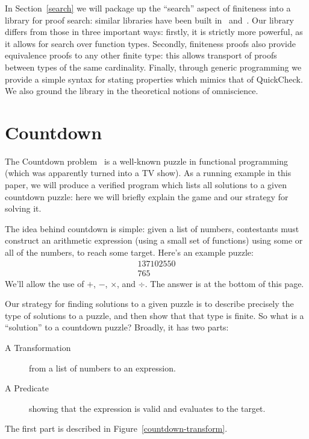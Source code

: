 In Section~\ref{search} we will package up the ``search'' aspect of finiteness
into a library for proof search: similar libraries have been built
in~\cite{fruminFiniteSetsHomotopy2018}
and~\cite{firsovDependentlyTypedProgramming2015}.
Our library differs from those in three important ways: firstly, it is strictly
more powerful, as it allows for search over function types.
Secondly, finiteness proofs also provide equivalence proofs to any other finite
type: this allows transport of proofs between types of the same cardinality.
Finally, through generic programming we provide a simple syntax for stating
properties which mimics that of QuickCheck.
We also ground the library in the theoretical notions of omniscience.
\section{Countdown}
The Countdown problem~\cite{huttonCountdownProblem2002} is a well-known puzzle
in functional programming (which was apparently turned into a TV show).
As a running example in this paper, we will produce a verified program which
lists all solutions to a given countdown puzzle: here we will briefly explain
the game and our strategy for solving it.

The idea behind countdown is simple: given a list of numbers, contestants must
construct an arithmetic expression (using a small set of functions) using some
or all of the numbers, to reach some target.
Here's an example puzzle:
\begin{gather*}
  \boxed{1} \boxed{3} \boxed{7} \boxed{10} \boxed{25} \boxed{50} \\
  \boxed{765} \tag{Target}
\end{gather*}
We'll allow the use of \(+\), \(-\), \(\times\), and \(\div\).
The answer is at the bottom of this page\footnotemark.


Our strategy for finding solutions to a given puzzle is to describe precisely
the type of solutions to a puzzle, and then show that that type is finite.
So what is a ``solution'' to a countdown puzzle?
Broadly, it has two parts:
\begin{description}
  \item[A Transformation] from a list of numbers to an expression.
  \item[A Predicate] showing that the expression is valid and evaluates to the
    target.
\end{description}
The first part is described in Figure~\ref{countdown-transform}.

